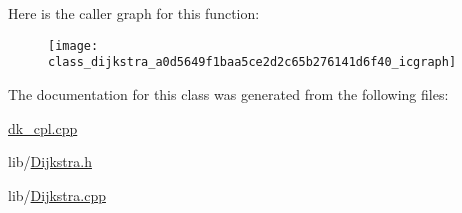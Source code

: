 Here is the caller graph for this function\-:
\nopagebreak
\begin{figure}[H]
\begin{center}
\leavevmode
\texttt{[image: class\_dijkstra\_a0d5649f1baa5ce2d2c65b276141d6f40\_icgraph]}
\end{center}
\end{figure}




The documentation for this class was generated from the following files\-:\begin{DoxyCompactItemize}
\item 
\hyperlink{dk__cpl_8cpp}{dk\-\_\-cpl.\-cpp}\item 
lib/\hyperlink{_dijkstra_8h}{Dijkstra.\-h}\item 
lib/\hyperlink{_dijkstra_8cpp}{Dijkstra.\-cpp}\end{DoxyCompactItemize}
